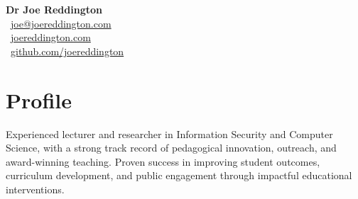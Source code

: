 \documentclass[11pt,a4paper]{article}
\makeatletter
\newcommand{\contactInfo}{
    \faEnvelope\ \href{mailto:joe@joereddington.com}{joe@joereddington.com} \\
    \faGlobe\ \href{https://joereddington.com}{joereddington.com} \\
    \faGithub\ \href{https://github.com/joereddington}{github.com/joereddington}
}
\makeatother
\begin{document}
\begin{center}
    {\LARGE \textbf{Dr Joe Reddington}}\\[1mm]
    \contactInfo
\end{center}

\vspace{1em}

\section*{Profile}
Experienced lecturer and researcher in Information Security and Computer Science, with a strong track record of pedagogical innovation, outreach, and award-winning teaching. Proven success in improving student outcomes, curriculum development, and public engagement through impactful educational interventions.






\end{document}
